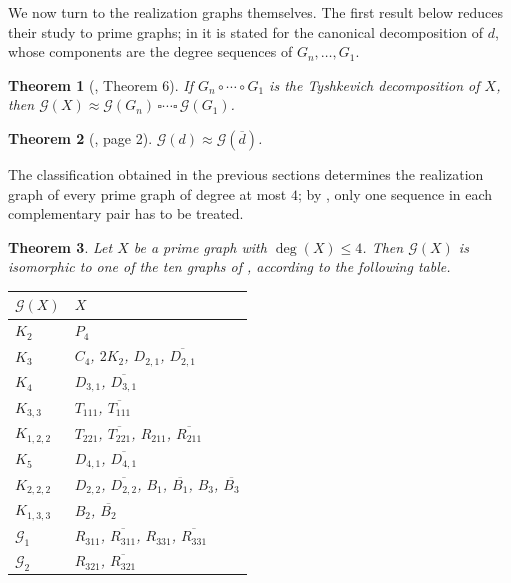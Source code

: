 \documentclass[11pt]{article}
\newtheorem{theorem}{Theorem}[section]
\begin{document}
We now turn to the realization graphs themselves. The first result below
reduces their study to prime graphs; in \cite{barrus2016realization} it is
stated for the canonical decomposition of $d$, whose components are the
degree sequences of $G_n,\dots,G_1$.

\begin{theorem}[\cite{barrus2016realization}, Theorem 6]
	\label{G.producto}
	If $G_n\circ\cdots\circ G_1$ is the Tyshkevich decomposition of $X$,
	then
	$\mathcal{G}(X)\approx\mathcal{G}(G_n)\,\square\cdots\square\,\mathcal{G}(G_1)$.
\end{theorem}

\begin{theorem}[\cite{barrus2023cliques}, page 2]
	\label{dual.spaces.iso}
	$\mathcal{G}(d)\approx\mathcal{G}(\overline{d})$.
\end{theorem}

The classification obtained in the previous sections determines the
realization graph of every prime graph of degree at most $4$; by
, only one sequence in each complementary pair has
to be treated.

\begin{theorem}
	\label{realization.graphs.deg<5}
	Let $X$ be a prime graph with $\deg(X)\leq 4$. Then $\mathcal{G}(X)$
	is isomorphic to one of the ten graphs of
	, according to the following table.
	\begin{center}
		\begin{tabular}{ll}
			\hline
			$\mathcal{G}(X)$ & $X$ \\
			\hline
			$K_2$ & $P_4$\\
			$K_3$ & $C_4$, $2K_2$, $D_{2,1}$, $\overline{D_{2,1}}$\\
			$K_4$ & $D_{3,1}$, $\overline{D_{3,1}}$\\
			$K_{3,3}$ & $T_{111}$, $\overline{T_{111}}$\\
			$K_{1,2,2}$ & $T_{221}$, $\overline{T_{221}}$, $R_{211}$, $\overline{R_{211}}$\\
			$K_5$ & $D_{4,1}$, $\overline{D_{4,1}}$\\
			$K_{2,2,2}$ & $D_{2,2}$, $\overline{D_{2,2}}$, $B_1$, $\overline{B_1}$, $B_3$, $\overline{B_3}$\\
			$K_{1,3,3}$ & $B_2$, $\overline{B_2}$\\
			$\mathcal{G}_1$ & $R_{311}$, $\overline{R_{311}}$, $R_{331}$, $\overline{R_{331}}$\\
			$\mathcal{G}_2$ & $R_{321}$, $\overline{R_{321}}$\\
			\hline
		\end{tabular}
	\end{center}
\end{theorem}
\end{document}
